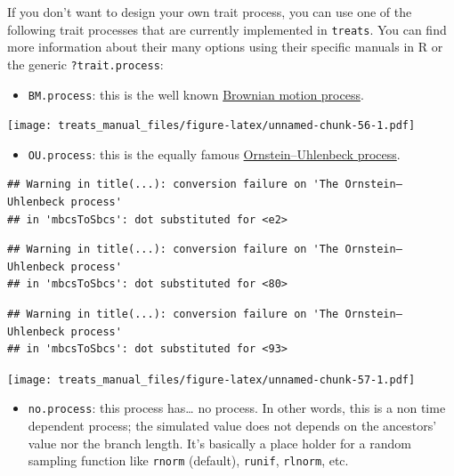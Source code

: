 \documentclass[
]{book}
\providecommand{\tightlist}{%
  \setlength{\itemsep}{0pt}\setlength{\parskip}{0pt}}
\begin{document}
If you don't want to design your own trait process, you can use one of the following trait processes that are currently implemented in \texttt{treats}. You can find more information about their many options using their specific manuals in R or the generic \texttt{?trait.process}:

\begin{itemize}
\tightlist
\item
  \texttt{BM.process}: this is the well known \href{https://en.wikipedia.org/wiki/Brownian_motion}{Brownian motion process}.
\end{itemize}

\texttt{[image: treats\_manual\_files/figure-latex/unnamed-chunk-56-1.pdf]}

\begin{itemize}
\tightlist
\item
  \texttt{OU.process}: this is the equally famous \href{https://en.wikipedia.org/wiki/Ornstein\%E2\%80\%93Uhlenbeck_process}{Ornstein--Uhlenbeck process}.
\end{itemize}

\begin{verbatim}
## Warning in title(...): conversion failure on 'The Ornstein–Uhlenbeck process'
## in 'mbcsToSbcs': dot substituted for <e2>
\end{verbatim}

\begin{verbatim}
## Warning in title(...): conversion failure on 'The Ornstein–Uhlenbeck process'
## in 'mbcsToSbcs': dot substituted for <80>
\end{verbatim}

\begin{verbatim}
## Warning in title(...): conversion failure on 'The Ornstein–Uhlenbeck process'
## in 'mbcsToSbcs': dot substituted for <93>
\end{verbatim}

\texttt{[image: treats\_manual\_files/figure-latex/unnamed-chunk-57-1.pdf]}

\begin{itemize}
\tightlist
\item
  \texttt{no.process}: this process has\ldots{} no process. In other words, this is a non time dependent process; the simulated value does not depends on the ancestors' value nor the branch length. It's basically a place holder for a random sampling function like \texttt{rnorm} (default), \texttt{runif}, \texttt{rlnorm}, etc.
\end{itemize}
\end{document}
